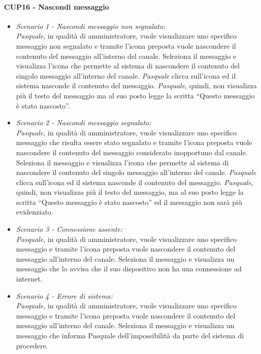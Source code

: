 \paragraph{CUP16 - Nascondi messaggio\\}
\begin{itemize}
	\item \textit{Scenario 1 - Nascondi messaggio non segnalato:\\}
	\textit{Pasquale}, in qualità di amministratore, vuole visualizzare uno specifico messaggio non segnalato e tramite l’icona preposta vuole nascondere il contenuto del messaggio all’interno del canale. Seleziona il messaggio e visualizza l’icona che permette al sistema di nascondere il contenuto del singolo messaggio all’interno del canale. \textit{Pasquale} clicca sull’icona ed il sistema nasconde il contenuto del messaggio. \textit{Pasquale}, quindi, non visualizza più il testo del messaggio ma al suo posto legge la scritta “Questo messaggio è stato nascosto”.\\
	
	\item \textit{Scenario 2 - Nascondi messaggio segnalato:\\}
	\textit{Pasquale}, in qualità di amministratore, vuole visualizzare uno specifico messaggio che risulta essere stato segnalato e tramite l’icona preposta vuole nascondere il contenuto del messaggio considerato inopportuno dal canale. Seleziona il messaggio e visualizza l’icona che permette al sistema di nascondere il contenuto del singolo messaggio all’interno del canale. \textit{Pasquale} clicca sull’icona ed il sistema nasconde il contenuto del messaggio. \textit{Pasquale}, quindi, non visualizza più il testo del messaggio, ma al suo posto legge la scritta “Questo messaggio è stato nascosto” ed il messaggio non sarà più evidenziato.\\
	
	\item \textit{Scenario 3 - Connessione assente:\\}
	\textit{Pasquale}, in qualità di amministratore, vuole visualizzare uno specifico messaggio e tramite l’icona preposta vuole nascondere il contenuto del messaggio all’interno del canale. Seleziona il messaggio e visualizza un messaggio che lo avvisa che il suo dispositivo non ha una connessione ad internet.\\
	
	\item \textit{Scenario 4 - Errore di sistema:\\}
	\textit{Pasquale}, in qualità di amministratore, vuole visualizzare uno specifico messaggio e tramite l’icona preposta vuole nascondere il contenuto del messaggio all’interno del canale. Seleziona il messaggio e visualizza un messaggio che informa Pasquale dell’impossibilità da parte del sistema di procedere.\\
	

\end{itemize}
